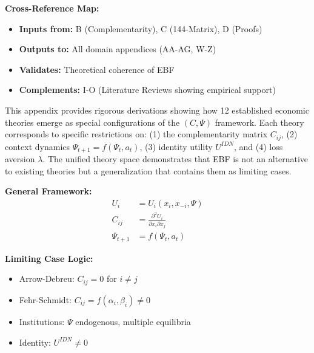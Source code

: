 
\noindent\textbf{Cross-Reference Map:}
\begin{itemize}[nosep]
    \item \textbf{Inputs from:} B (Complementarity), C (144-Matrix), D (Proofs)
    \item \textbf{Outputs to:} All domain appendices (AA-AG, W-Z)
    \item \textbf{Validates:} Theoretical coherence of EBF
    \item \textbf{Complements:} I-O (Literature Reviews showing empirical support)
\end{itemize}


\begin{tcolorbox}[colback=green!5!white, colframe=green!75!black,
    title=\textbf{Abstract}]

This appendix provides rigorous derivations showing how 12 established economic
theories emerge as special configurations of the $(C, \Psi)$ framework. Each
theory corresponds to specific restrictions on: (1) the complementarity matrix
$C_{ij}$, (2) context dynamics $\Psi_{t+1} = f(\Psi_t, a_t)$, (3) identity utility
$U^{IDN}$, and (4) loss aversion $\lambda$. The unified theory space demonstrates
that EBF is not an alternative to existing theories but a generalization that
contains them as limiting cases.

\end{tcolorbox}


\begin{tcolorbox}[colback=yellow!10!white, colframe=orange!75!black,
    title=\textbf{Quick Reference}]

\textbf{General Framework:}
\begin{align}
U_i &= U_i(x_i, x_{-i}, \Psi) \tag{A-Utility} \\
C_{ij} &= \frac{\partial^2 U_i}{\partial x_i \partial x_j} \tag{A-Comp} \\
\Psi_{t+1} &= f(\Psi_t, a_t) \tag{A-Context}
\end{align}

\textbf{Limiting Case Logic:}
\begin{itemize}[nosep]
    \item Arrow-Debreu: $C_{ij} = 0$ for $i \neq j$
    \item Fehr-Schmidt: $C_{ij} = f(\alpha_i, \beta_i) \neq 0$
    \item Institutions: $\Psi$ endogenous, multiple equilibria
    \item Identity: $U^{IDN} \neq 0$
\end{itemize}

\end{tcolorbox}

